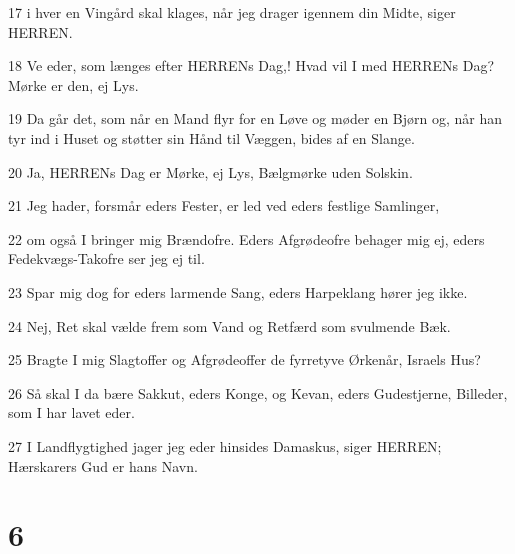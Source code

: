 \par 17 i hver en Vingård skal klages, når jeg drager igennem din Midte, siger HERREN.
\par 18 Ve eder, som længes efter HERRENs Dag,! Hvad vil I med HERRENs Dag? Mørke er den, ej Lys.
\par 19 Da går det, som når en Mand flyr for en Løve og møder en Bjørn og, når han tyr ind i Huset og støtter sin Hånd til Væggen, bides af en Slange.
\par 20 Ja, HERRENs Dag er Mørke, ej Lys, Bælgmørke uden Solskin.
\par 21 Jeg hader, forsmår eders Fester, er led ved eders festlige Samlinger,
\par 22 om også I bringer mig Brændofre. Eders Afgrødeofre behager mig ej, eders Fedekvægs-Takofre ser jeg ej til.
\par 23 Spar mig dog for eders larmende Sang, eders Harpeklang hører jeg ikke.
\par 24 Nej, Ret skal vælde frem som Vand og Retfærd som svulmende Bæk.
\par 25 Bragte I mig Slagtoffer og Afgrødeoffer de fyrretyve Ørkenår, Israels Hus?
\par 26 Så skal I da bære Sakkut, eders Konge, og Kevan, eders Gudestjerne, Billeder, som I har lavet eder.
\par 27 I Landflygtighed jager jeg eder hinsides Damaskus, siger HERREN; Hærskarers Gud er hans Navn.

\chapter{6}

